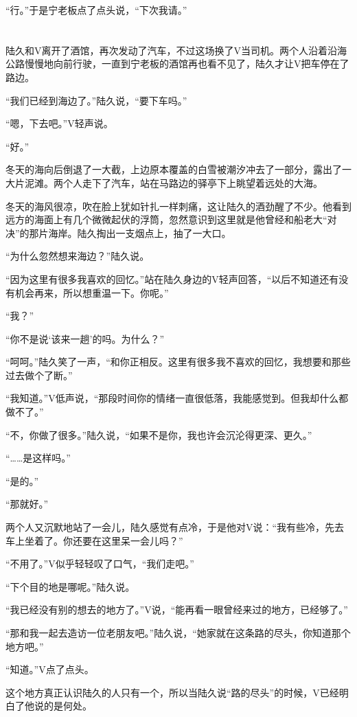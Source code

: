 “行。”于是宁老板点了点头说，“下次我请。”

\section*{}

陆久和V离开了酒馆，再次发动了汽车，不过这场换了V当司机。两个人沿着沿海公路慢慢地向前行驶，一直到宁老板的酒馆再也看不见了，陆久才让V把车停在了路边。

“我们已经到海边了。”陆久说，“要下车吗。”

“嗯，下去吧。”V轻声说。

“好。”

冬天的海向后倒退了一大截，上边原本覆盖的白雪被潮汐冲去了一部分，露出了一大片泥滩。两个人走下了汽车，站在马路边的驿亭下上眺望着远处的大海。

冬天的海风很凉，吹在脸上犹如针扎一样刺痛，这让陆久的酒劲醒了不少。他看到远方的海面上有几个微微起伏的浮筒，忽然意识到这里就是他曾经和船老大“对决”的那片海岸。陆久掏出一支烟点上，抽了一大口。

“为什么忽然想来海边？”陆久说。

“因为这里有很多我喜欢的回忆。”站在陆久身边的V轻声回答，“以后不知道还有没有机会再来，所以想重温一下。你呢。”

“我？”

“你不是说‘该来一趟’的吗。为什么？”

“呵呵。”陆久笑了一声，“和你正相反。这里有很多我不喜欢的回忆，我想要和那些过去做个了断。”

“我知道。”V低声说，“那段时间你的情绪一直很低落，我能感觉到。但我却什么都做不了。”

“不，你做了很多。”陆久说，“如果不是你，我也许会沉沦得更深、更久。”

“……是这样吗。”

“是的。”

“那就好。”

两个人又沉默地站了一会儿，陆久感觉有点冷，于是他对V说：“我有些冷，先去车上坐着了。你还要在这里呆一会儿吗？”

“不用了。”V似乎轻轻叹了口气，“我们走吧。”

“下个目的地是哪呢。”陆久说。

“我已经没有别的想去的地方了。”V说，“能再看一眼曾经来过的地方，已经够了。”

“那和我一起去造访一位老朋友吧。”陆久说，“她家就在这条路的尽头，你知道那个地方吧。”

“知道。”V点了点头。

这个地方真正认识陆久的人只有一个，所以当陆久说“路的尽头”的时候，V已经明白了他说的是何处。

